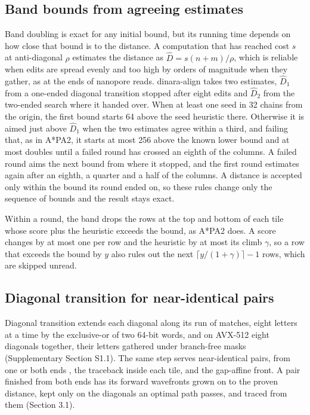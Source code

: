 \subsection{Band bounds from agreeing estimates}

Band doubling is exact for any initial bound, but its running time depends on how close that bound is to the distance. A computation that has reached cost \(s\) at anti-diagonal \(\rho\) estimates the distance as \(\hat D = s(n+m)/\rho\), which is reliable when edits are spread evenly and too high by orders of magnitude when they gather, as at the ends of nanopore reads. dinara-align takes two estimates, \(\hat D_1\) from a one-ended diagonal transition stopped after eight edits and \(\hat D_2\) from the two-ended search where it handed over. When at least one seed in 32 chains from the origin, the first bound starts 64 above the seed heuristic there. Otherwise it is aimed just above \(\hat D_1\) when the two estimates agree within a third, and failing that, as in A*PA2, it starts at most 256 above the known lower bound and at most doubles until a failed round has crossed an eighth of the columns. A failed round aims the next bound from where it stopped, and the first round estimates again after an eighth, a quarter and a half of the columns. A distance is accepted only within the bound its round ended on, so these rules change only the sequence of bounds and the result stays exact.

Within a round, the band drops the rows at the top and bottom of each tile whose score plus the heuristic exceeds the bound, as A*PA2 does. A score changes by at most one per row and the heuristic by at most its climb \(\gamma\), so a row that exceeds the bound by \(y\) also rules out the next \(\lceil y/(1+\gamma) \rceil - 1\) rows, which are skipped unread.

\subsection{Diagonal transition for near-identical pairs}

Diagonal transition extends each diagonal along its run of matches, eight letters at a time by the exclusive-or of two 64-bit words, and on AVX-512 eight diagonals together, their letters gathered under branch-free masks (Supplementary Section S1.1). The same step serves near-identical pairs, from one or both ends \citep{MarcoSola2023biwfa}, the traceback inside each tile, and the gap-affine front. A pair finished from both ends has its forward wavefronts grown on to the proven distance, kept only on the diagonals an optimal path passes, and traced from them (Section 3.1).

